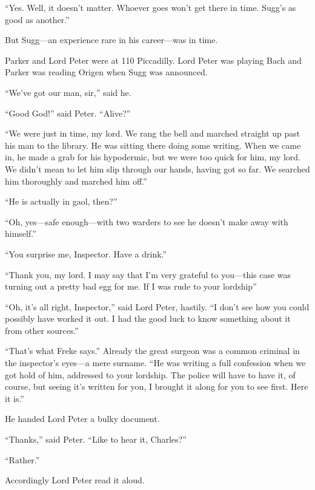 \enquote{Yes. Well, it doesn’t matter. Whoever goes won’t get there in time. Sugg’s as good as another.}

But Sugg\allowbreak---\allowbreak an experience rare in his career\allowbreak---\allowbreak was in time.

Parker and Lord Peter were at 110 Piccadilly. Lord Peter was playing Bach and Parker was reading Origen when Sugg was announced.

\enquote{We’ve got our man, sir,} said he.

\enquote{Good God!} said Peter. \enquote{Alive?}

\enquote{We were just in time, my lord. We rang the bell and marched straight up past his man to the library. He was sitting there doing some writing. When we came in, he made a grab for his hypodermic, but we were too quick for him, my lord. We didn’t mean to let him slip through our hands, having got so far. We searched him thoroughly and marched him off.}

\enquote{He is actually in gaol, then?}

\enquote{Oh, yes\allowbreak---\allowbreak safe enough\allowbreak---\allowbreak with two warders to see he doesn’t make away with himself.}

\enquote{You surprise me, Inspector. Have a drink.}

\enquote{Thank you, my lord. I may say that I’m very grateful to you\allowbreak---\allowbreak this case was turning out a pretty bad egg for me. If I was rude to your lordship\longdash}

\enquote{Oh, it’s all right, Inspector,} said Lord Peter, hastily. \enquote{I don’t see how you could possibly have worked it out. I had the good luck to know something about it from other sources.}

\enquote{That’s what Freke says.} Already the great surgeon was a common criminal in the inspector’s eyes\allowbreak---\allowbreak a mere surname. \enquote{He was writing a full confession when we got hold of him, addressed to your lordship. The police will have to have it, of course, but seeing it’s written for you, I brought it along for you to see first. Here it is.}

He handed Lord Peter a bulky document.

\enquote{Thanks,} said Peter. \enquote{Like to hear it, Charles?}

\enquote{Rather.}

Accordingly Lord Peter read it aloud.